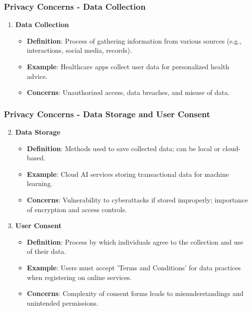 \documentclass[aspectratio=169]{beamer}
\begin{document}
\begin{frame}[fragile]
    \frametitle{Privacy Concerns - Data Collection}
    \begin{enumerate}
        \item \textbf{Data Collection}
        \begin{itemize}
            \item \textbf{Definition}: Process of gathering information from various sources (e.g., interactions, social media, records).
            \item \textbf{Example}: Healthcare apps collect user data for personalized health advice.
            \item \textbf{Concerns}: Unauthorized access, data breaches, and misuse of data.
        \end{itemize}
    \end{enumerate}
\end{frame}

\begin{frame}[fragile]
    \frametitle{Privacy Concerns - Data Storage and User Consent}
    \begin{enumerate}
        \setcounter{enumi}{1}
        \item \textbf{Data Storage}
        \begin{itemize}
            \item \textbf{Definition}: Methods used to save collected data; can be local or cloud-based.
            \item \textbf{Example}: Cloud AI services storing transactional data for machine learning.
            \item \textbf{Concerns}: Vulnerability to cyberattacks if stored improperly; importance of encryption and access controls.
        \end{itemize}

        \item \textbf{User Consent}
        \begin{itemize}
            \item \textbf{Definition}: Process by which individuals agree to the collection and use of their data.
            \item \textbf{Example}: Users must accept 'Terms and Conditions' for data practices when registering on online services.
            \item \textbf{Concerns}: Complexity of consent forms leads to misunderstandings and unintended permissions.
        \end{itemize}
    \end{enumerate}
\end{frame}
\end{document}
